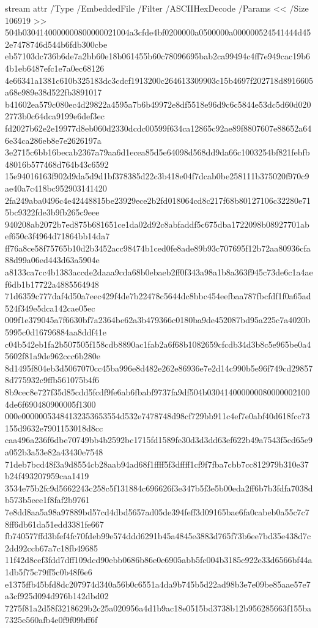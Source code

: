 \begingroup
{}
\immediate\pdfobj stream attr {
  /Type /EmbeddedFile /Filter /ASCIIHexDecode
  /Params << /Size 106919 >>
} {
504b0304140000000800000021004a3cfde4bf0200000a0500000a000000524541444d452e7478746d544b6fdb300cbe
eb57103dc736b6de7a2bb60e18b061455b60c78096695bab2ca99494c4ff7e949cac19b64b1eb6487efc1e7a0ec68126
4e66341a1381c610b325183dc3cdcf1913200c264613309903c15b4697f202718d8916605a68e989e38d522fb3891017
b41602ea579c080ec4d29822a4595a7b6b49972e8df5518e96d9c6c5844e53dc5d60d0202773b0c64dca9199e6def3ec
fd2027b62e2e19977d8eb060d2330dcdc00599f634ca12865c92ae89f8807607e88652a646e34ca286eb8e7e2626197a
3e2715c6bb16becab2367a79aa6d1ecea85d5e64098d568dd9da66c1003254bf821febfb48016b577468d764b43c6592
15e94016163f902d9da5d9d1bf378385d22c3b418e04f7dcab0be258111b375020f970c9ae40a7c418bc952903141420
2fa249aba0496c4e42448815be23929ece2b2fd018064cd8c217f68b80127106c32280e715bc9322fde3b9fb265c9eee
940208ab2072b7ed875b681651ce1da02d92c8abfaddf5c675dba1722098b08927701abef650c3f4964d71864bb14da7
ff76a8ce58f75765b10d2b3452acc98474b1ced0fe8ade89b93c707695f12b72aa80936cfa88d99a06ed443d63a5904e
a8133ca7cc4b1383accde2daaa9cda68b0ebaeb2ff0f343a98a1b8a363f945c73de6c1a4aef6db1b17722a4885564948
71d6359c777daf4d50a7eec429f4de7b22478c5644dc8bbc454eefbaa787fbcfdf1f0a65ad524f349e5dca142cae05ec
009f1e379045a7f6630bf7a2364be62a3b479366c0180ba9de452087bd95a225c7a4020b5995c0d16796884aa8ddf41e
c04b542eb1fa2b507505f158cdb8890ac1fab2a6f68b1082659cfcdb34d3b8c5e965be0a45602f81a9de962ccc6b280e
8d1495f804eb3d5067070cc45ba996e8d482e262e86936e7e2d14c990b5e96f749cd298578d775932c9ffb561075b4f6
8b9cec8e727f35d85cdd5fcdf9fe6ab6fbabf9737fa9df504b0304140000000800000021004de6f690480900005f1300
000e00000053484132353653554d532e7478748d98cf729bb911c4ef7e0abf40d618fcc73155d9632e7901153018d8cc
caa496a236f6dbe70749bb4b2592bc1715fd1589fe30d3d3dd63ef622b49a7543f5cd65e9a052b3a53e82a43430e7548
71deb7bcd48f3a9d8554cb28aab94ad68f1ffff5f3dffff1cf9f7fba7cbb7cc812979b310e37b24f493207959caa1419
3534e75b2fc9d5662243c258c5f131884c696626f3e347b5f3e5b00eda2ff6b7b3fdfa7038db573b5eee1f8faf2b9761
7e8dd8aa5a98a97889bd57cd4dbd5657ad05de394feff3d09165bae6fa0cabeb0a55c7c78ff6db61da51edd3381fe667
fb740577ffd3bfef4fc70fdeb99e574ddd6291b45a4845e3883d765f73b6ee7bd35e438d7c2dd92ccb67a7c18fb49685
11f42d8cef3fdd7dff109dcd90ebb0686b86e0e6905abb5fc004b3185c922e33d6566bf44a1db5f75c79ff5c0b48f6e6
e1375ffb45bfd8dc207974d340a56b0c6551a4da9b745b5d22ad98b3e7e09be85aae57e7a3cf925d094d976b142dbd02
7275f81a2d58f3218629b2c25a020956a4d1b9ac18e0515bd3738b12b956285663f155ba7325e560afb4e0f9f09bff6f
}
